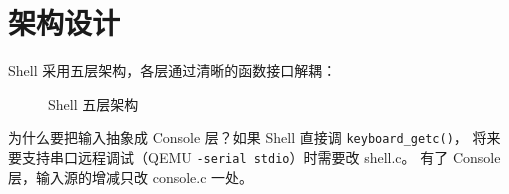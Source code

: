\section{架构设计}

Shell 采用五层架构，各层通过清晰的函数接口解耦：

\begin{figure}[H]
  \centering
  
  \caption{Shell 五层架构}
\end{figure}

\begin{thinkbox}
为什么要把输入抽象成 Console 层？如果 Shell 直接调 \texttt{keyboard\_getc()}，
将来要支持串口远程调试（QEMU \texttt{-serial stdio}）时需要改 shell.c。
有了 Console 层，输入源的增减只改 console.c 一处。
\end{thinkbox}


